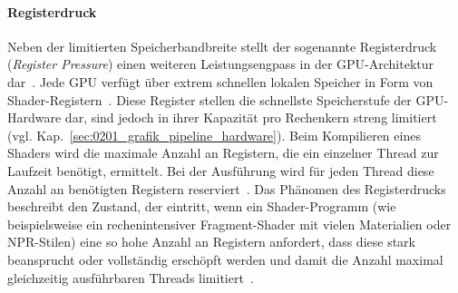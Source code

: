 \paragraph{Registerdruck}
Neben der limitierten Speicherbandbreite stellt der sogenannte Registerdruck (\textit{Register Pressure}) einen
weiteren Leistungsengpass in der \ac{GPU}-Architektur dar~\parencite[vgl.][S.~801~u.~904]{akenine-mollerRealtimeRendering2019}.
Jede \ac{GPU} verfügt über extrem schnellen lokalen Speicher in Form von
Shader-Registern~\parencite[vgl.][Kap.~11.2.5.1,~Abschn.~\textit{Shader Registers}]{gregoryGameEngineArchitecture2018}.
Diese Register stellen die schnellste Speicherstufe der \ac{GPU}-Hardware dar, sind jedoch in ihrer Kapazität
pro Rechenkern streng limitiert~\parencite[vgl.][S.~791]{akenine-mollerRealtimeRendering2019}
(vgl. Kap.~\ref{sec:0201_grafik_pipeline_hardware}).
Beim Kompilieren eines Shaders wird die maximale Anzahl an Registern, die ein einzelner Thread zur Laufzeit benötigt,
ermittelt.
Bei der Ausführung wird für jeden Thread diese Anzahl an benötigten Registern
reserviert~\parencites(vgl.)()[Abschn.~\textit{The Logical Pipeline}, Punkt~8]{pixeljetstreamPixelJetStream2015}
[S.~32]{akenine-mollerRealtimeRendering2019}.
Das Phänomen des Registerdrucks beschreibt den Zustand, der eintritt, wenn ein Shader-Programm
(wie beispielsweise ein rechenintensiver Fragment-Shader mit vielen Materialien oder \ac{NPR}-Stilen) eine so hohe
Anzahl an Registern anfordert, dass diese stark beansprucht oder vollständig erschöpft
werden und damit die Anzahl maximal gleichzeitig ausführbaren Threads
limitiert~\parencite[vgl.][S.~32~u.~904]{akenine-mollerRealtimeRendering2019}.


